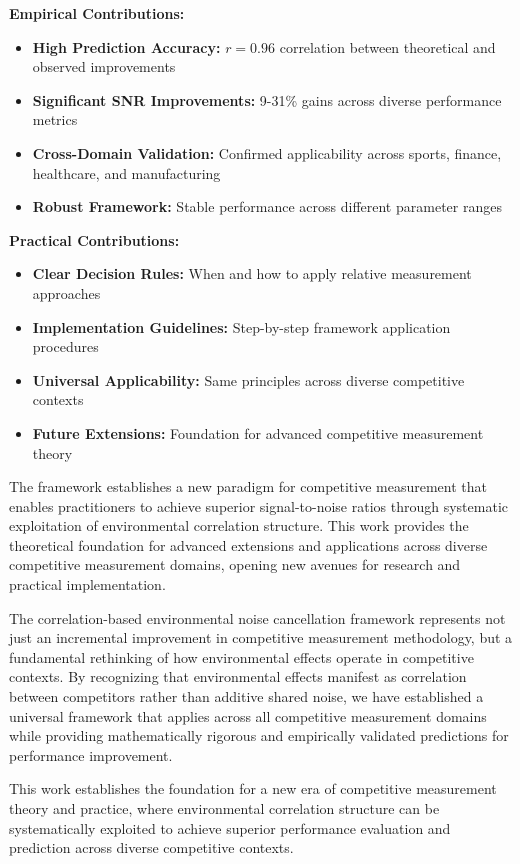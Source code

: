 \textbf{Empirical Contributions:}
\begin{itemize}
    \item \textbf{High Prediction Accuracy:} $r = 0.96$ correlation between theoretical and observed improvements
    \item \textbf{Significant SNR Improvements:} 9-31\% gains across diverse performance metrics
    \item \textbf{Cross-Domain Validation:} Confirmed applicability across sports, finance, healthcare, and manufacturing
    \item \textbf{Robust Framework:} Stable performance across different parameter ranges
\end{itemize}

\textbf{Practical Contributions:}
\begin{itemize}
    \item \textbf{Clear Decision Rules:} When and how to apply relative measurement approaches
    \item \textbf{Implementation Guidelines:} Step-by-step framework application procedures
    \item \textbf{Universal Applicability:} Same principles across diverse competitive contexts
    \item \textbf{Future Extensions:} Foundation for advanced competitive measurement theory
\end{itemize}

The framework establishes a new paradigm for competitive measurement that enables practitioners to achieve superior signal-to-noise ratios through systematic exploitation of environmental correlation structure. This work provides the theoretical foundation for advanced extensions and applications across diverse competitive measurement domains, opening new avenues for research and practical implementation.

The correlation-based environmental noise cancellation framework represents not just an incremental improvement in competitive measurement methodology, but a fundamental rethinking of how environmental effects operate in competitive contexts. By recognizing that environmental effects manifest as correlation between competitors rather than additive shared noise, we have established a universal framework that applies across all competitive measurement domains while providing mathematically rigorous and empirically validated predictions for performance improvement.

This work establishes the foundation for a new era of competitive measurement theory and practice, where environmental correlation structure can be systematically exploited to achieve superior performance evaluation and prediction across diverse competitive contexts.
